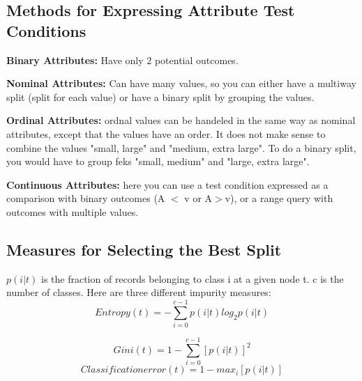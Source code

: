 	\subsection{Methods for Expressing Attribute Test Conditions}

		{\bf Binary Attributes:} Have only 2 potential outcomes.

		{\bf Nominal Attributes:} Can have many values, so you can either have
		a multiway split (split for each value) or have a binary split by grouping
		the values. 

		{\bf Ordinal Attributes:} ordnal values can be handeled in the same way as
		nominal attributes, except that the values have an order. It does not make
		sense to combine the values "small, large" and "medium, extra large". To do
		a binary split, you would have to group feks "small, medium" and "large, extra large".

		{\bf Continuous Attributes:} here you can use a test condition expressed as a
		comparison with binary outcomes (A $<$ v or A$>$v), or a range query with outcomes 
		with multiple values. 

	\clearpage
	\subsection{Measures for Selecting the Best Split}
		$p(i|t)$ is the fraction of records belonging  to class i at a given node t.		
		c is the number of classes.
		Here are three different impurity measures: 
		\begin{equation}
			Entropy(t) = -\sum_{i=0}^{c-1} p(i|t)log_{2}p(i|t)
		\end{equation}

		\begin{equation}
			Gini(t) = 1 - \sum_{i=0}^{c-1}[p(i|t)]^{2}
		\end{equation}
		\begin{equation}
			Classification error(t) = 1 - max_{i}[p(i|t)]
		\end{equation}

